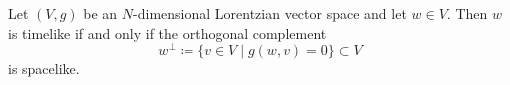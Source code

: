 Let $(V, g)$ be an $N$-dimensional Lorentzian vector space and let $w \in V$. Then $w$ is timelike if and only if the orthogonal complement
$$w^\perp \coloneqq \{ v \in V \mid g(w, v) = 0 \} \subset V$$
is spacelike.
